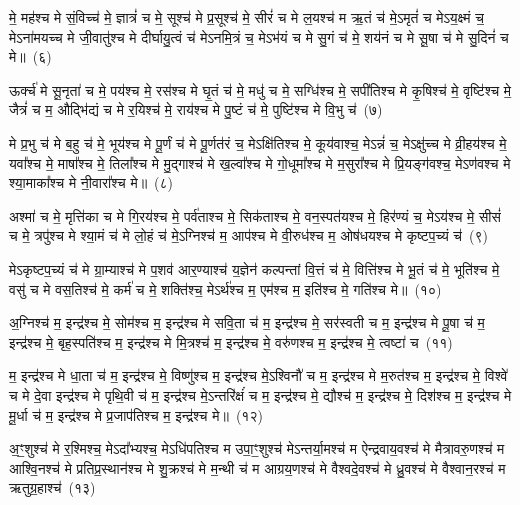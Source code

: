 मे॒ मह॑श्च मे सं॒विच्च॑ मे॒ ज्ञात्रं॑ च मे॒ सूश्च॑ मे प्र॒सूश्च॑ मे॒ सीरं॑ च मे ल॒यश्च॑ म ऋ॒तं च॑ मे॒\-ऽमृतं॑ च मे\-ऽय॒क्ष्मं च॒ मे\-ऽना॑मयच्च मे जी॒वातु॑श्च मे दीर्घायु॒त्वं च॑ मे\-ऽनमि॒त्रं च॒ मे\-ऽभ॑यं च मे सु॒गं च॑ मे॒ शय॑नं च मे सू॒षा च॑ मे सु॒दिनं॑ च मे॥~(६)\ip

{\anuvakamend[{विश्वं॑ च॒ शय॑नम॒ष्टौ च॑}]}

ऊर्क्च॑ मे सू॒नृता॑ च मे॒ पय॑श्च मे॒ रस॑श्च मे घृ॒तं च॑ मे॒ मधु॑ च मे॒ सग्धि॑श्च मे॒ सपी॑तिश्च मे कृ॒षिश्च॑ मे॒ वृष्टि॑श्च मे॒ जैत्रं॑ च म॒ औद्भि॑द्यं च मे र॒यिश्च॑ मे॒ राय॑श्च मे पु॒ष्टं च॑ मे॒ पुष्टि॑श्च मे वि॒भु च॑~(७)\ip

मे प्र॒भु च॑ मे ब॒हु च॑ मे॒ भूय॑श्च मे पू॒र्णं च॑ मे पू॒र्णत॑रं च॒ मे\-ऽक्षि॑तिश्च मे॒ कूय॑वाश्च॒ मे\-ऽन्नं॑ च॒ मे\-ऽक्षु॑च्च मे व्री॒हय॑श्च मे॒ यवा᳚श्च मे॒ माषा᳚श्च मे॒ तिला᳚श्च मे मु॒द्गाश्च॑ मे ख॒ल्वा᳚श्च मे गो॒धूमा᳚श्च मे म॒सुरा᳚श्च मे प्रि॒यङ्ग॑वश्च॒ मे\-ऽण॑वश्च मे श्या॒माका᳚श्च मे नी॒वारा᳚श्च मे॥~(८)\ip

{\anuvakamend[{वि॒भु च॑ म॒सुरा॒श्चतु॑र्दश च}]}

अश्मा॑ च मे॒ मृत्ति॑का च मे गि॒रय॑श्च मे॒ पर्व॑ताश्च मे॒ सिक॑ताश्च मे॒ वन॒स्पत॑यश्च मे॒ हिर॑ण्यं च॒ मे\-ऽय॑श्च मे॒ सीसं॑ च मे॒ त्रपु॑श्च मे श्या॒मं च॑ मे लो॒हं च॑ मे॒\-ऽग्निश्च॑ म॒ आप॑श्च मे वी॒रुध॑श्च म॒ ओष॑धयश्च मे कृष्टप॒च्यं च॑~(९)\ip

मे\-ऽकृष्टप॒च्यं च॑ मे ग्रा॒म्याश्च॑ मे प॒शव॑ आर॒ण्याश्च॑ य॒ज्ञेन॑ कल्पन्तां वि॒त्तं च॑ मे॒ वित्ति॑श्च मे भू॒तं च॑ मे॒ भूति॑श्च मे॒ वसु॑ च मे वस॒तिश्च॑ मे॒ कर्म॑ च मे॒ शक्ति॑श्च॒ मे\-ऽर्थ॑श्च म॒ एम॑श्च म॒ इति॑श्च मे॒ गति॑श्च मे॥~(१०)\ip

{\anuvakamend[{कृ॒ष्ट॒प॒च्यञ्चा॒ष्टाच॑त्वारिꣳशच्च}]}

अ॒ग्निश्च॑ म॒ इन्द्र॑श्च मे॒ सोम॑श्च म॒ इन्द्र॑श्च मे सवि॒ता च॑ म॒ इन्द्र॑श्च मे॒ सर॑स्वती च म॒ इन्द्र॑श्च मे पू॒षा च॑ म॒ इन्द्र॑श्च मे॒ बृह॒स्पति॑श्च म॒ इन्द्र॑श्च मे मि॒त्रश्च॑ म॒ इन्द्र॑श्च मे॒ वरु॑णश्च म॒ इन्द्र॑श्च मे॒ त्वष्टा॑ च~(११)\ip

म॒ इन्द्र॑श्च मे धा॒ता च॑ म॒ इन्द्र॑श्च मे॒ विष्णु॑श्च म॒ इन्द्र॑श्च मे॒\-ऽश्विनौ॑ च म॒ इन्द्र॑श्च मे म॒रुत॑श्च म॒ इन्द्र॑श्च मे॒ विश्वे॑ च मे दे॒वा इन्द्र॑श्च मे पृथि॒वी च॑ म॒ इन्द्र॑श्च मे॒\-ऽन्तरि॑क्षंं च म॒ इन्द्र॑श्च मे॒ द्यौश्च॑ म॒ इन्द्र॑श्च मे॒ दिश॑श्च म॒ इन्द्र॑श्च मे मू॒र्धा च॑ म॒ इन्द्र॑श्च मे प्र॒जा\-प॑तिश्च म॒ इन्द्र॑श्च मे॥~(१२)\ip

{\anuvakamend[{त्वष्टा॑ च॒ द्यौश्च॑ म॒ एक॑विꣳशतिश्च}]}

अ॒ꣳ॒शुश्च॑ मे र॒श्मिश्च॒ मे\-ऽदा᳚भ्यश्च॒ मे\-ऽधि॑\-पतिश्च म उपा॒ꣳ॒शुश्च॑ मे\-ऽन्तर्या॒मश्च॑ म ऐन्द्रवाय॒वश्च॑ मे मैत्रावरु॒णश्च॑ म आश्वि॒नश्च॑ मे प्रतिप्र॒स्थान॑श्च मे शु॒क्रश्च॑ मे म॒न्थी च॑ म आग्रय॒णश्च॑ मे वैश्वदे॒वश्च॑ मे ध्रु॒वश्च॑ मे वैश्वान॒रश्च॑ म ऋतुग्र॒हाश्च॑~(१३)\ip

